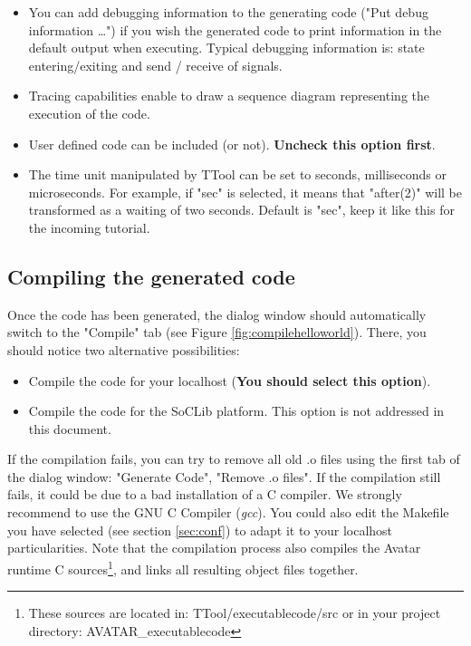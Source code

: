 \documentclass[12pt]{article}
\begin{document}
\begin{itemize}
\item You can add debugging information to the generating code ("Put debug information \ldots") if you wish the generated code to print information in the default output when executing. Typical debugging information is: state entering/exiting and send / receive of signals.
\item Tracing capabilities enable to draw a sequence diagram representing the execution of the code.
\item User defined code can be included (or not). \textbf{Uncheck this option first}.
\item The time unit manipulated by TTool can be set to seconds, milliseconds or microseconds. For example, if "sec" is selected, it means that  "after(2)" will be transformed as a waiting of two seconds. Default is "sec", keep it like this for the incoming tutorial.
\end{itemize}

\subsection{Compiling the generated code}
Once the code has been generated, the dialog window should automatically switch to the "Compile" tab (see Figure \ref{fig:compilehelloworld}). There, you should notice two alternative possibilities:
\begin{itemize}
\item Compile the code for your localhost (\textbf{You should select this option}).
\item Compile the code for the SoCLib platform. This option is not addressed in this document.
\end{itemize}
If the compilation fails, you can try to remove all old .o files using the first tab of the dialog window: "Generate Code", "Remove .o files". If the compilation still fails, it could be due to a bad installation of a C compiler. We strongly recommend to use the GNU C Compiler (\textit{gcc}). You could also edit the Makefile you have selected (see section \ref{sec:conf}) to adapt it to your localhost particularities.  Note that the compilation process also compiles the Avatar runtime C sources\footnote{These sources are located in: TTool/executablecode/src or in your project directory: AVATAR_executablecode}, and links all resulting object files together.
\end{document}
